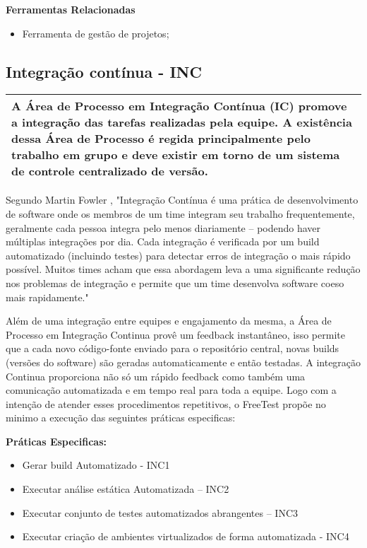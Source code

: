 \textbf{ Ferramentas Relacionadas }
\begin{itemize}
\item Ferramenta de gestão de projetos;
\end{itemize}

\subsection{Integração contínua - INC}
\label{sec:inc}

\begin{table}[!ht]
\centering
\begin{tabular}{|p{130mm}|}
\hline
A Área de Processo em Integração Contínua (IC) promove a integração das tarefas realizadas pela equipe. A existência dessa Área de Processo é regida principalmente pelo trabalho em grupo e deve existir em torno de um sistema de controle centralizado de versão. \\
\hline
\end{tabular}
\end{table}

Segundo Martin Fowler \cite{Beck2001}, "Integração Contínua é uma prática de desenvolvimento de software onde os membros de um time integram seu trabalho frequentemente, geralmente cada pessoa integra pelo menos diariamente – podendo haver múltiplas integrações por dia. Cada integração é verificada por um build automatizado (incluindo testes) para detectar erros de integração o mais rápido possível. Muitos times acham que essa abordagem leva a uma significante redução nos problemas de integração e permite que um time desenvolva software coeso mais rapidamente."

Além de uma integração entre equipes e engajamento da mesma, a Área de Processo em Integração Continua provê um feedback instantâneo, isso permite que a cada novo código-fonte enviado para o repositório central, novas builds (versões do software) são geradas automaticamente e então testadas. A integração Continua proporciona não só um rápido feedback como também uma comunicação automatizada e em tempo real para toda a equipe. Logo com a intenção de atender esses procedimentos repetitivos, o FreeTest propõe no minimo a execução das seguintes práticas especificas:

\textbf{Práticas Especificas:}

\begin{itemize}    
    \item Gerar build Automatizado - INC1
    \item Executar análise estática Automatizada – INC2
    \item Executar conjunto de testes automatizados abrangentes – INC3
    \item Executar criação de ambientes virtualizados de forma automatizada - INC4
\end{itemize}


